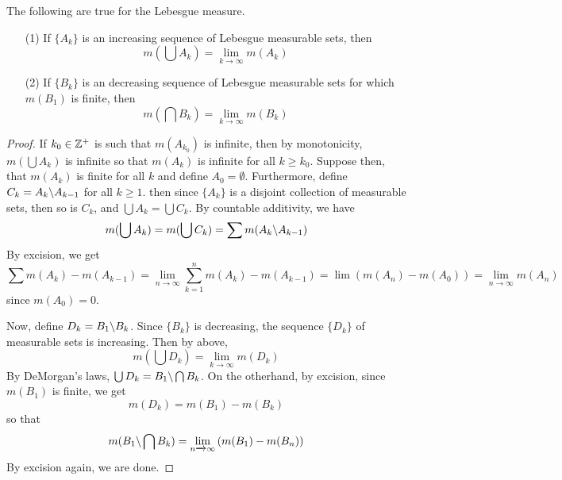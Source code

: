 \begin{theorem}[Continuity]\label{2.4.3}
    The following are true for the Lebesgue measure.
    \begin{enumerate}
        \item[(1)] If $\{A_k\}$ is an increasing sequence of Lebesgue measurable
            sets, then
            \begin{equation*}
                m(\bigcup{A_k})=\lim_{k \xrightarrow{} \infty}{m(A_k)}
            \end{equation*}

        \item[(2)] If $\{B_k\}$ is an decreasing sequence of Lebesgue measurable
            sets for which $m(B_1)$ is finite, then
            \begin{equation*}
                m(\bigcap{B_k})=\lim_{k \xrightarrow{} \infty}{m(B_k)}
            \end{equation*}
    \end{enumerate}
\end{theorem}
\begin{proof}
    If $k_0 \in \mathbb{Z}^+$ is such that $m(A_{k_0})$ is infinite, then by
    monotonicity, $m(\bigcup{A_k})$ is infinite so that $m(A_k)$ is infinite for
    all $k \geq k_0$. Suppose then, that $m(A_k)$ is finite for all $k$ and
    define  $A_0=\emptyset$. Furthermore, define $C_k=A_k\backslash A_{k-1}$ for
    all $k \geq 1$. then since  $\{A_k\}$ is a disjoint collection of measurable
    sets, then so is $C_k$, and  $\bigcup{A_k}=\bigcup{C_k}$. By countable
    additivity, we have
    \begin{equation*}
        m(\bigcup{A_k})=m(\bigcup{C_k})=\sum{m(A_k\backslash A_{k-1})}
    \end{equation*}
    By excision, we get
    \begin{equation*}
        \sum{m(A_k)-m(A_{k-1})}=\lim_{n \xrightarrow{}
        \infty}{\sum_{k=1}^n{m(A_k)-m(A_{k-1})}}=
        \lim{(m(A_n)-m(A_0))}=\lim_{n \xrightarrow{} \infty}{m(A_n)}
    \end{equation*}
    since $m(A_0)=0$.

    Now, define $D_k=B_1\backslash B_k$. Since $\{B_k\}$ is decreasing, the
    sequence $\{D_k\}$ of measurable sets is increasing. Then by above,
    \begin{equation*}
        m(\bigcup{D_k})=\lim_{k \xrightarrow{} \infty}{m(D_k)}
    \end{equation*}
    By DeMorgan's laws, $\bigcup{D_k}=B_1\backslash\bigcap{B_k}$. On the
    otherhand, by excision, since $m(B_1)$ is finite, we get
    \begin{equation*}
        m(D_k)=m(B_1)-m(B_k)
    \end{equation*}
    so that
    \begin{equation*}
        m(B_1\backslash\bigcap{B_k})=\lim_{n \xrightarrow{} \infty}{(m(B_1)-m(B_n))}
    \end{equation*}
    By excision again, we are done.
\end{proof}


